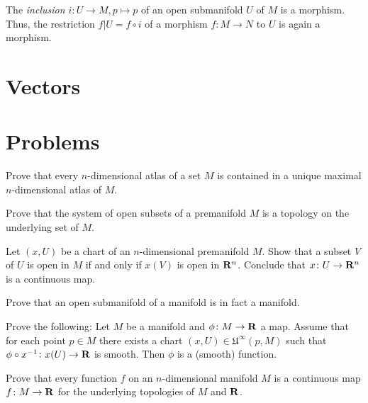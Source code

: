The \emph{inclusion $i\colon U \to M, p \mapsto p$} of an open submanifold $U$
of $M$ is a morphism. Thus, the restriction $f|U = f \circ i$ of a morphism
$f\colon M \to N$ to $U$ is again a morphism.

\section{Vectors}
\label{sec:vectors}



\section{Problems}

\begin{xca}
  Prove that every $n$-dimensional atlas of a set $M$ is contained in a unique
  maximal $n$-dimensional atlas of $M$.
\end{xca}

\begin{xca}
  Prove that the system of open subsets of a premanifold $M$ is a topology on
  the underlying set of $M$.
\end{xca}

\begin{xca}
  Let $(x, U)$ be a chart of an $n$-dimensional premanifold $M$. Show that a 
  subset $V$ of $U$ is open in $M$ if and only if $x(V)$ is open in $\mathbf{R}^n$.
  Conclude that $x\colon U \to \mathbf{R}^n$ is a continuous map.
\end{xca}

\begin{xca}
  Prove that an open submanifold of a manifold is in fact a manifold.
\end{xca}

\begin{xca}
  Prove the following:
  Let $M$ be a manifold and $\phi\colon M \to \mathbf{R}$ a map. Assume that for each
  point $p \in M$ there exists a chart $(x, U) \in \mathfrak U^\infty(p, M)$
  such that $\phi \circ x^{-1}\colon x(U) \to \mathbf{R}$ is smooth. Then $\phi$
  is a (smooth) function.
\end{xca}

\begin{xca}
  Prove that every function $f$ on an $n$-dimensional manifold $M$ is a
  continuous map $f\colon M \to \mathbf{R}$ for the underlying topologies of $M$ and
  $\mathbf{R}$.
\end{xca}

